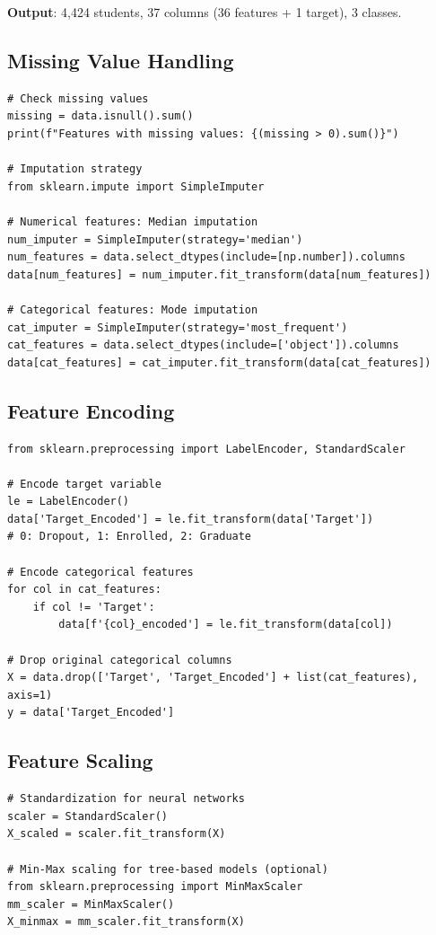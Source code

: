 \textbf{Output}: 4,424 students, 37 columns (36 features + 1 target), 3 classes.

\subsection{Missing Value Handling}

\begin{verbatim}
# Check missing values
missing = data.isnull().sum()
print(f"Features with missing values: {(missing > 0).sum()}")

# Imputation strategy
from sklearn.impute import SimpleImputer

# Numerical features: Median imputation
num_imputer = SimpleImputer(strategy='median')
num_features = data.select_dtypes(include=[np.number]).columns
data[num_features] = num_imputer.fit_transform(data[num_features])

# Categorical features: Mode imputation
cat_imputer = SimpleImputer(strategy='most_frequent')
cat_features = data.select_dtypes(include=['object']).columns
data[cat_features] = cat_imputer.fit_transform(data[cat_features])
\end{verbatim}

\subsection{Feature Encoding}

\begin{verbatim}
from sklearn.preprocessing import LabelEncoder, StandardScaler

# Encode target variable
le = LabelEncoder()
data['Target_Encoded'] = le.fit_transform(data['Target'])
# 0: Dropout, 1: Enrolled, 2: Graduate

# Encode categorical features
for col in cat_features:
    if col != 'Target':
        data[f'{col}_encoded'] = le.fit_transform(data[col])

# Drop original categorical columns
X = data.drop(['Target', 'Target_Encoded'] + list(cat_features), axis=1)
y = data['Target_Encoded']
\end{verbatim}

\subsection{Feature Scaling}

\begin{verbatim}
# Standardization for neural networks
scaler = StandardScaler()
X_scaled = scaler.fit_transform(X)

# Min-Max scaling for tree-based models (optional)
from sklearn.preprocessing import MinMaxScaler
mm_scaler = MinMaxScaler()
X_minmax = mm_scaler.fit_transform(X)
\end{verbatim}


